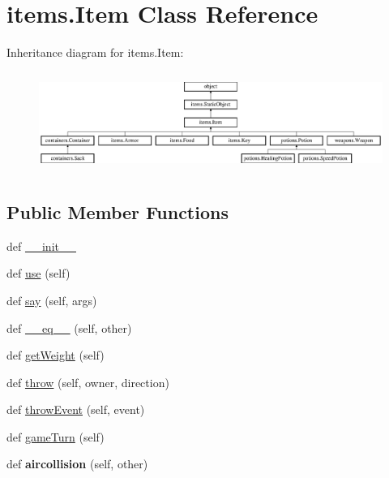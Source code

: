 \hypertarget{classitems_1_1_item}{}\section{items.\+Item Class Reference}
\label{classitems_1_1_item}
Inheritance diagram for items.\+Item\+:\begin{figure}[H]
\begin{center}
\leavevmode
\includegraphics[height=3.286385cm]{classitems_1_1_item}
\end{center}
\end{figure}
\subsection*{Public Member Functions}
\begin{DoxyCompactItemize}
\item 
def \hyperlink{classitems_1_1_item_ae3de3fd45b979ded986138a71d80441d}{\+\_\+\+\_\+init\+\_\+\+\_\+}
\item 
def \hyperlink{classitems_1_1_item_adef3ba0298ba7345eadea2bb776edfe9}{use} (self)
\item 
def \hyperlink{classitems_1_1_item_a5b4e0b576ce4dac2031c9c3b2d6140e1}{say} (self, args)
\item 
def \hyperlink{classitems_1_1_item_a401a88231e01b131d27c410996734f6c}{\+\_\+\+\_\+eq\+\_\+\+\_\+} (self, other)
\item 
def \hyperlink{classitems_1_1_item_a7e80e9908e2a7cfff8e8f1bb8ca060a2}{get\+Weight} (self)
\item 
def \hyperlink{classitems_1_1_item_aa729c1ff69df390a0564b06e498ca213}{throw} (self, owner, direction)
\item 
def \hyperlink{classitems_1_1_item_adaea6b467affcc07d421008bf42330a0}{throw\+Event} (self, event)
\item 
def \hyperlink{classitems_1_1_item_aa25d9560ac3b920b5eb77dd4a62b3cc1}{game\+Turn} (self)
\item 
\hypertarget{classitems_1_1_item_ab0fd260891814b0dfce25a1566293ae9}{}def {\bfseries aircollision} (self, other)\label{classitems_1_1_item_ab0fd260891814b0dfce25a1566293ae9}

\end{DoxyCompactItemize}
